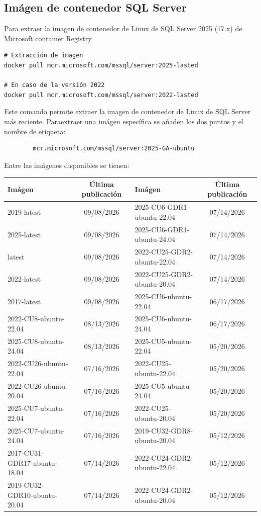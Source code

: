     \subsection{Imágen de contenedor SQL Server}
    Para  extraer la imagen de contenedor de Linux de SQL Server 2025 (17.x) de Microsoft container Registry
\begin{lstlisting}
# Extracción de imagen
docker pull mcr.microsoft.com/mssql/server:2025-lasted

# En caso de la versión 2022
docker pull mcr.microsoft.com/mssql/server:2022-lasted
\end{lstlisting}
    Este comando permite extraer la imagen de contenedor de Linux de SQL Server más reciente. Paraextraer una imágen específica se añaden los dos puntos y el nombre de etiqueta:
    \begin{verbatim}
        mcr.microsoft.com/mssql/server:2025-GA-ubuntu
    \end{verbatim}
    Entre las imágenes disponibles se tienen:
    \begin{table}[H]
        \begin{center}
            \begin{tabular}{l|c||l|c}
                \textbf{Imágen} & \textbf{Última publicación} & \textbf{Imágen} & \textbf{Última publicación} \\\hline\hline
                2019-latest & 09/08/2026 & 2025-CU6-GDR1-ubuntu-22.04 & 07/14/2026 \\\hline
                2025-latest & 09/08/2026 & 2025-CU6-GDR1-ubuntu-24.04 & 07/14/2026 \\\hline
                latest & 09/08/2026 & 2022-CU25-GDR2-ubuntu-22.04 & 07/14/2026 \\\hline
                2022-latest & 09/08/2026 & 2022-CU25-GDR2-ubuntu-20.04 & 07/14/2026 \\\hline
                2017-latest & 09/08/2026 & 2025-CU6-ubuntu-22.04 & 06/17/2026 \\\hline
                2022-CU8-ubuntu-22.04 & 08/13/2026 & 2025-CU6-ubuntu-24.04 & 06/17/2026 \\\hline
                2025-CU8-ubuntu-24.04 & 08/13/2026 & 2025-CU5-ubuntu-22.04 & 05/20/2026 \\\hline
                2022-CU26-ubuntu-22.04 & 07/16/2026 & 2022-CU25-ubuntu-22.04 & 05/20/2026 \\\hline
                2022-CU26-ubuntu-20.04 & 07/16/2026 & 2025-CU5-ubuntu-24.04 & 05/20/2026 \\\hline
                2025-CU7-ubuntu-22.04 & 07/16/2026 & 2022-CU25-ubuntu-20.04 & 05/20/2026 \\\hline
                2025-CU7-ubuntu-24.04 & 07/16/2026 & 2019-CU32-GDR8-ubuntu-20.04 & 05/12/2026 \\\hline
                2017-CU31-GDR17-ubuntu-18.04 & 07/14/2026 & 2022-CU24-GDR2-ubuntu-22.04 & 05/12/2026 \\\hline
                2019-CU32-GDR10-ubuntu-20.04 & 07/14/2026 & 2022-CU24-GDR2-ubuntu-20.04 & 05/12/2026 \\\hline
            \end{tabular}
        \end{center}
    \end{table}
